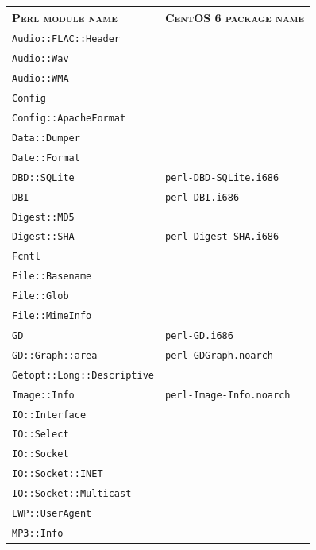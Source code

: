 \documentclass[a4paper,oneside,10pt]{report}
\begin{document}
\begin{table}
	\centering
	\begin{tabular}{|p{15em}|p{18em}|}
		\hline
		\textsc{Perl module name} 						&  \textsc{CentOS 6 package name}\\
		\hline
		\hline
		\verb|Audio::FLAC::Header| 						& \\
		\hline
		\verb|Audio::Wav| 										& \\
		\hline
		\verb|Audio::WMA| 										& \\
		\hline
		\verb|Config| 												& \\
		\hline
		\verb|Config::ApacheFormat|						& \\
		\hline
		\verb|Data::Dumper| 									& \\
		\hline
		\verb|Date::Format| 									&	\\
		\hline
		\verb|DBD::SQLite|										& \verb|perl-DBD-SQLite.i686| \\
		\hline
		\verb|DBI|														& \verb|perl-DBI.i686| \\
		\hline
		\verb|Digest::MD5| 										& \\
		\hline
		\verb|Digest::SHA| 										& \verb|perl-Digest-SHA.i686| \\
		\hline
		\verb|Fcntl| 													& \\
		\hline
		\verb|File::Basename| 								& \\
		\hline
		\verb|File::Glob| 										& \\
		\hline
		\verb|File::MimeInfo| 								& \\
		\hline
		\verb|GD| 														& \verb|perl-GD.i686|\\
		\hline
		\verb|GD::Graph::area| 								& \verb|perl-GDGraph.noarch| \\
		\hline
		\verb|Getopt::Long::Descriptive| 			& \\
		\hline
		\verb|Image::Info| 										& \verb|perl-Image-Info.noarch| \\
		\hline
		\verb|IO::Interface| 									& \\
		\hline
		\verb|IO::Select| 										& \\
		\hline
		\verb|IO::Socket| 										& \\
		\hline
		\verb|IO::Socket::INET| 							& \\
		\hline
		\verb|IO::Socket::Multicast| 					& \\
		\hline
		\verb|LWP::UserAgent| 								& \\
		\hline
		\verb|MP3::Info| 											& \\

\end{tabular}
\end{table}
\end{document}
